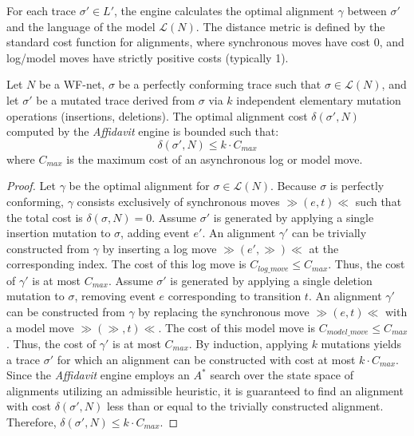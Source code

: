 For each trace $\sigma' \in L'$, the engine calculates the optimal alignment $\gamma$ between $\sigma'$ and the language of the model $\mathcal{L}(N)$. The distance metric is defined by the standard cost function for alignments, where synchronous moves have cost 0, and log/model moves have strictly positive costs (typically 1).

\begin{theorem}
\label{thm:cost_bounds}
Let $N$ be a WF-net, $\sigma$ be a perfectly conforming trace such that $\sigma \in \mathcal{L}(N)$, and let $\sigma'$ be a mutated trace derived from $\sigma$ via $k$ independent elementary mutation operations (insertions, deletions). The optimal alignment cost $\delta(\sigma', N)$ computed by the \textit{Affidavit} engine is bounded such that:
$$ \delta(\sigma', N) \le k \cdot C_{max} $$
where $C_{max}$ is the maximum cost of an asynchronous log or model move.
\end{theorem}

\begin{proof}
Let $\gamma$ be the optimal alignment for $\sigma \in \mathcal{L}(N)$. Because $\sigma$ is perfectly conforming, $\gamma$ consists exclusively of synchronous moves $\gg (e, t) \ll$ such that the total cost is $\delta(\sigma, N) = 0$.
Assume $\sigma'$ is generated by applying a single insertion mutation to $\sigma$, adding event $e'$. An alignment $\gamma'$ can be trivially constructed from $\gamma$ by inserting a log move $\gg (e', \gg) \ll$ at the corresponding index. The cost of this log move is $C_{log\_move} \le C_{max}$. Thus, the cost of $\gamma'$ is at most $C_{max}$.
Assume $\sigma'$ is generated by applying a single deletion mutation to $\sigma$, removing event $e$ corresponding to transition $t$. An alignment $\gamma'$ can be constructed from $\gamma$ by replacing the synchronous move $\gg (e, t) \ll$ with a model move $\gg (\gg, t) \ll$. The cost of this model move is $C_{model\_move} \le C_{max}$. Thus, the cost of $\gamma'$ is at most $C_{max}$.
By induction, applying $k$ mutations yields a trace $\sigma'$ for which an alignment can be constructed with cost at most $k \cdot C_{max}$. Since the \textit{Affidavit} engine employs an $A^*$ search over the state space of alignments utilizing an admissible heuristic, it is guaranteed to find an alignment with cost $\delta(\sigma', N)$ less than or equal to the trivially constructed alignment. Therefore, $\delta(\sigma', N) \le k \cdot C_{max}$.
\end{proof}

